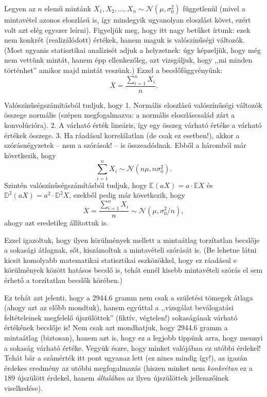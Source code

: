 \documentclass[]{book}
\begin{document}
Legyen az \(n\) elemű mintánk \(X_1,X_2,\ldots,X_n\sim\mathcal{N}\left(\mu,\sigma_0^2\right)\) függetlenül (mivel a mintavétel azonos eloszlású is, így mindegyik ugyanolyan eloszlást követ, ezért volt azt elég egyszer leírni). Figyeljük meg, hogy itt nagy betűket írtunk: ezek nem konkrét (realizálódott) értékek, hanem maguk is valószínűségi változók. (Most ugyanis statisztikai analízisét adjuk a helyzetnek: úgy képzeljük, hogy még nem vettünk mintát, hanem épp ellenkezőleg, azt vizsgáljuk, hogy ,,mi minden történhet'' amikor majd mintát veszünk.) Ezzel a becslőfüggvényünk:
\[
    \overline{X}=\frac{\sum_{i=1}^n X_i}{n}.
\]

Valószínűségszámításból tudjuk, hogy
1. Normális eloszlású valószínűségi változók összege normális (szépen megfogalmazva: a normális eloszláscsalád zárt a konvolúcióra).
2. A várható érték lineáris, így egy összeg várható értéke a várható értékek összege.
3. Ha ráadásul korrelálatlan (de csak ez esetben!), akkor a szórásnégyzetek -- nem a szórások! -- is összeadódnak.
Ebből a háromból már következik, hogy
\[
    \sum_{i=1}^n X_i\sim\mathcal{N}\left(n\mu,n\sigma_0^2\right).
\]
Szintén valószínűségszámításból tudjuk, hogy \(\mathbb{E}\left(aX\right)=a \cdot \mathbb{E}X\) és \(\mathbb{D}^2\left(aX\right)=a^2 \cdot \mathbb{D}^2 X\), ezekből pedig már következik, hogy
\[
    \overline{X}=\frac{\sum_{i=1}^n X_i}{n} \sim \mathcal{N}\left(\mu,\sigma_0^2/n\right),
\]
ahogy azt eredetileg állítottuk is.

Ezzel igazoltuk, hogy ilyen körülmények mellett a mintaátlag torzítatlan becslője a sokasági átlagnak, sőt, kiszámoltuk a mintavételi szórását is. (Be lehetne látni kicsit komolyabb matematikai statisztikai eszközökkel, hogy ez ráadásul e körülmények között hatásos becslő is, tehát ennél kisebb mintavételi szórás el sem érhető a torzítatlan becslők körében.)

Ez tehát azt jelenti, hogy a 2944.6 gramm nem csak a születési tömegek átlaga (ahogy azt az előbb mondtuk), hanem egyúttal a ,,vizsgálat beválogatási feltételeinek megfelelő újszülöttek'' (fiktív, végtelen!) sokaságának várható értékének becslője is! Nem csak azt mondhatjuk, hogy 2944.6 gramm a mintaátlag (biztosan), hanem azt is, hogy ez a legjobb tippünk arra, hogy mennyi a sokaság várható értéke. Vegyük észre, hogy minket valójában ez utóbbi érdekel! Tehát bár a számérték itt pont ugyanaz lett (ez nincs mindig így!), az igazán érdekes eredmény az utóbbi megfogalmazás (hiszen minket nem \emph{konkrétan} ez a 189 újszülött érdekel, hanem \emph{általában} az ilyen újszülöttek jellemzőinek viselkedése).
\end{document}
